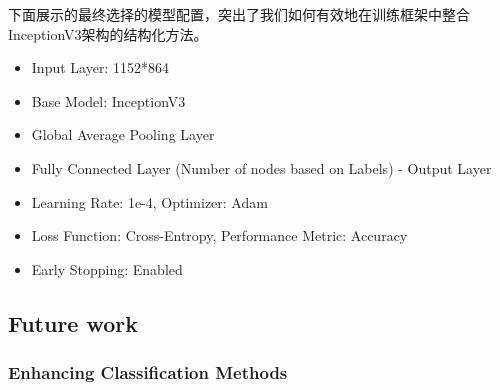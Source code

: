 下面展示的最终选择的模型配置，突出了我们如何有效地在训练框架中整合InceptionV3架构的结构化方法。

    
        
        
\begin{itemize}
    \item Input Layer: 1152*864
    \item Base Model: InceptionV3
    \item Global Average Pooling Layer
    \item Fully Connected Layer (Number of nodes based on Labels) - Output Layer
    \item Learning Rate: 1e-4, Optimizer: Adam
    \item Loss Function: Cross-Entropy, Performance Metric: Accuracy
    \item Early Stopping: Enabled
\end{itemize}

\subsection{Future work}
\subsubsection{Enhancing Classification Methods}

